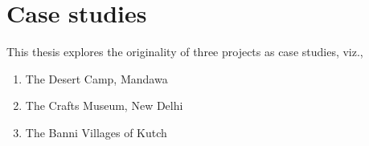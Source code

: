 \chapter{Case studies} %
\label{cha:case_studies}

This thesis explores the originality of three projects as case studies, viz.,

\begin{enumerate}
  \item The Desert Camp, Mandawa
  \item The Crafts Museum, New Delhi
  \item The Banni Villages of Kutch
\end{enumerate}







